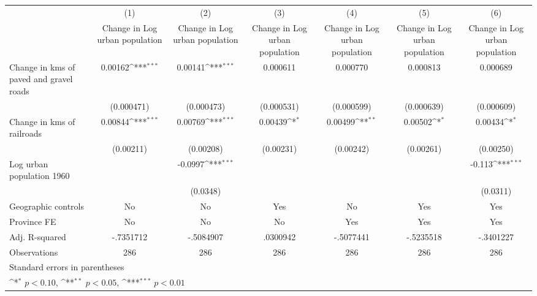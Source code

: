 {
\def\sym#1{\ifmmode^{#1}\else\(^{#1}\)\fi}
\begin{tabular}{l*{6}{c}}
\hline\hline
                    &\multicolumn{1}{c}{(1)}&\multicolumn{1}{c}{(2)}&\multicolumn{1}{c}{(3)}&\multicolumn{1}{c}{(4)}&\multicolumn{1}{c}{(5)}&\multicolumn{1}{c}{(6)}\\
                    &\multicolumn{1}{c}{Change in Log urban population}&\multicolumn{1}{c}{Change in Log urban population}&\multicolumn{1}{c}{Change in Log urban population}&\multicolumn{1}{c}{Change in Log urban population}&\multicolumn{1}{c}{Change in Log urban population}&\multicolumn{1}{c}{Change in Log urban population}\\
\hline
Change in kms of paved and gravel roads&     0.00162\sym{***}&     0.00141\sym{***}&    0.000611         &    0.000770         &    0.000813         &    0.000689         \\
                    &  (0.000471)         &  (0.000473)         &  (0.000531)         &  (0.000599)         &  (0.000639)         &  (0.000609)         \\
[1em]
Change in kms of railroads&     0.00844\sym{***}&     0.00769\sym{***}&     0.00439\sym{*}  &     0.00499\sym{**} &     0.00502\sym{*}  &     0.00434\sym{*}  \\
                    &   (0.00211)         &   (0.00208)         &   (0.00231)         &   (0.00242)         &   (0.00261)         &   (0.00250)         \\
[1em]
Log urban population 1960&                     &     -0.0997\sym{***}&                     &                     &                     &      -0.113\sym{***}\\
                    &                     &    (0.0348)         &                     &                     &                     &    (0.0311)         \\
\hline
Geographic controls &          No         &          No         &         Yes         &          No         &         Yes         &         Yes         \\
Province FE         &          No         &          No         &          No         &         Yes         &         Yes         &         Yes         \\
Adj. R-squared      &   -.7351712         &   -.5084907         &    .0300942         &   -.5077441         &   -.5235518         &   -.3401227         \\
Observations        &         286         &         286         &         286         &         286         &         286         &         286         \\
\hline\hline
\multicolumn{7}{l}{\footnotesize Standard errors in parentheses}\\
\multicolumn{7}{l}{\footnotesize \sym{*} \(p<0.10\), \sym{**} \(p<0.05\), \sym{***} \(p<0.01\)}\\
\end{tabular}
}
